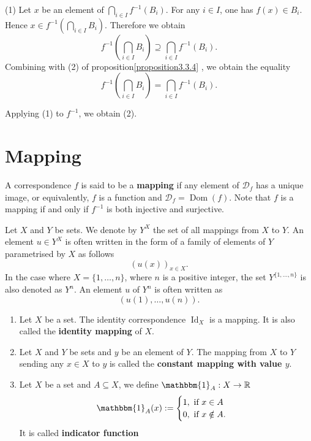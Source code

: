 \begin{proofenv}
    \quad
    \newline
(1) Let \( x \) be an element of \(\bigcap_{i \in I} f^{-1}(B_i)\). For any \( i \in I \),  one has \( f(x) \in B_i \). Hence \( x \in f^{-1}(\bigcap_{i \in I} B_i) \). Therefore we obtain
\[
f^{-1}\left(\bigcap_{i \in I} B_i\right) \supseteq \bigcap_{i \in I} f^{-1}(B_i).
\]
\newline
Combining with (2) of proposition\ref{proposition3.3.4} ,  we obtain the equality
\[
f^{-1}\left(\bigcap_{i \in I} B_i\right) = \bigcap_{i \in I} f^{-1}(B_i).
\]

Applying (1) to \( f^{-1} \),  we obtain (2).
\end{proofenv} 


\section{Mapping}
\begin{definitionenv}
   A correspondence \( f \) is said to be a \textbf{mapping} if any element of \( \mathscr{D}_f \) has a unique image,  or equivalently,  \( f \) is a function and \( \mathscr{D}_f = \operatorname{Dom}(f) \). Note that \( f \) is a mapping if and only if \( f^{-1} \) is both injective and surjective.

\end{definitionenv}





\begin{notationenv}\label{notation3.7.1}
    Let \( X \) and \( Y \) be sets. We denote by \( Y^X \) the set of all mappings from \( X \) to \( Y \). An element \( u \in Y^X \) is often written in the form of a family of elements of \( Y \) parametrised by \( X \) as follows
\[
(u(x))_{x \in X}.
\]
In the case where \( X = \{1,  \ldots,  n\} \),  where \( n \) is a positive integer,  the set \( Y^{\{1,  \ldots,  n\}} \) is also denoted as \( Y^n \). An element \( u \) of \( Y^n \) is often written as
\[
(u(1),  \ldots,  u(n)).
\]
\end{notationenv}


\begin{exampleenv}
    \quad
    \begin{enumerate}
    \item Let \( X \) be a set. The identity correspondence \( \operatorname{Id}_X \) is a mapping. It is also called the \textbf{identity mapping} of \( X \).
    \item Let \( X \) and \( Y \) be sets and \( y \) be an element of \( Y \). The mapping from \( X \) to \( Y \) sending any \( x \in X \) to \( y \) is called the \textbf{constant mapping with value \( y \)}.
    \item Let $X$ be a set and $A\subseteq X$,  we define $\mathbbm{1}_A:X\rightarrow \mathbb{R}$   
    $$\mathbbm{1}_A(x):=\begin{cases}
 1,  \text{ if }\space x \in A \\0, \text{ if }\space x \notin A.
\end{cases}$$ 
It is called \textbf{indicator function}
\end{enumerate}
\end{exampleenv}


